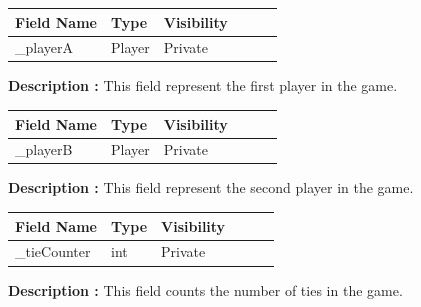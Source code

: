 \documentclass[12pt]{article}
\begin{document}
\begin{table}[H]
    \begin{tabular}{llllll}
    \hline
    \multicolumn{1}{|l|}{\cellcolor[HTML]{EFEFEF}\textbf{Field Name}} & \multicolumn{1}{l|}{\cellcolor[HTML]{EFEFEF}\textbf{Type}} & \multicolumn{1}{l|}{\cellcolor[HTML]{EFEFEF}\textbf{Visibility}} \\ \hline
    \multicolumn{1}{|l|}{\_playerA}                                      & \multicolumn{1}{l|}{Player}                                 & \multicolumn{1}{l|}{Private}                                     \\ \hline
    \end{tabular}
\end{table}

\textbf{Description :} This field represent the first player in the game.

\begin{table}[H]
    \begin{tabular}{llllll}
    \hline
    \multicolumn{1}{|l|}{\cellcolor[HTML]{EFEFEF}\textbf{Field Name}} & \multicolumn{1}{l|}{\cellcolor[HTML]{EFEFEF}\textbf{Type}} & \multicolumn{1}{l|}{\cellcolor[HTML]{EFEFEF}\textbf{Visibility}} \\ \hline
    \multicolumn{1}{|l|}{\_playerB}                                      & \multicolumn{1}{l|}{Player}                                 & \multicolumn{1}{l|}{Private}                                     \\ \hline
    \end{tabular}
\end{table}

\textbf{Description :} This field represent the second player in the game.

\begin{table}[H]
    \begin{tabular}{llllll}
    \hline
    \multicolumn{1}{|l|}{\cellcolor[HTML]{EFEFEF}\textbf{Field Name}} & \multicolumn{1}{l|}{\cellcolor[HTML]{EFEFEF}\textbf{Type}} & \multicolumn{1}{l|}{\cellcolor[HTML]{EFEFEF}\textbf{Visibility}} \\ \hline
    \multicolumn{1}{|l|}{\_tieCounter}                                      & \multicolumn{1}{l|}{int}                                 & \multicolumn{1}{l|}{Private}                                     \\ \hline
    \end{tabular}
\end{table}

\textbf{Description :} This field counts the number of ties in the game.
\end{document}

